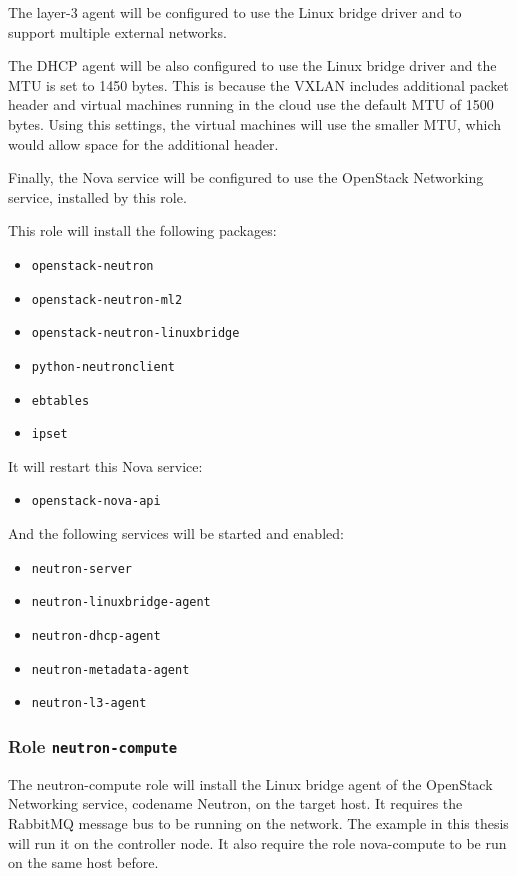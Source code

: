 The layer-3 agent will be configured to use the Linux bridge driver and to support multiple external networks.

The DHCP agent will be also configured to use the Linux bridge driver and the MTU is set to 1450 bytes. This is because the VXLAN includes additional packet header and virtual machines running in the cloud use the default MTU of 1500 bytes. Using this settings, the virtual machines will use the smaller MTU, which would allow space for the additional header.

Finally, the Nova service will be configured to use the OpenStack Networking service, installed by this role.

This role will install the following packages:
\begin{itemize}
  \item{\texttt{openstack-neutron}}
  \item{\texttt{openstack-neutron-ml2}}
  \item{\texttt{openstack-neutron-linuxbridge}}
  \item{\texttt{python-neutronclient}}
  \item{\texttt{ebtables}}
  \item{\texttt{ipset}}
\end{itemize}
It will restart this Nova service:
\begin{itemize}
  \item{\texttt{openstack-nova-api}}
\end{itemize}
And the following services will be started and enabled:
\begin{itemize}
  \item{\texttt{neutron-server}}
  \item{\texttt{neutron-linuxbridge-agent}}
  \item{\texttt{neutron-dhcp-agent}}
  \item{\texttt{neutron-metadata-agent}}
  \item{\texttt{neutron-l3-agent}}
\end{itemize}


\subsubsection*{Role \texttt{neutron-compute}}
The neutron-compute role will install the Linux bridge agent of the OpenStack Networking service, codename Neutron, on the target host.  It requires the RabbitMQ message bus to be running on the network. The example in this thesis will run it on the controller node. It also require the role nova-compute to be run on the same host before.

